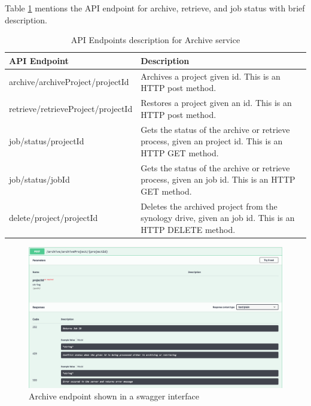     Table \ref{table:archiveEndpoints} mentions the API endpoint for archive, retrieve, and job status with brief description.
    \begin{table}[H]
        \centering
        \begin{tabular}{|p{6cm}|p{8cm}|}
            \hline
                \textbf{API Endpoint}&\textbf{Description}\\
            \hline
                archive/archiveProject/{{projectId}} & Archives a project given id. This is an HTTP post method.\\
            \hline
                retrieve/retrieveProject/{{projectId}} & Restores a project given an id. This is an HTTP post method.\\
            \hline
                job/status/{{projectId}} & Gets the status of the archive or retrieve process, given an project id. This is an HTTP GET method.\\
            \hline
                job/status/{{jobId}} & Gets the status of the archive or retrieve process, given an job id. This is an HTTP GET method.\\
            \hline
                delete/project/{{projectId}} & Deletes the archived project from the synology drive, given an job id. This is an HTTP DELETE method.\\
            \hline
        \end{tabular}
        \caption{API Endpoints description for Archive service}
        \label{table:archiveEndpoints}     
    \end{table}  
    \begin{figure}[H]
        \centering \includegraphics[scale=0.3]{grafiken/archiveSwagger.png}
        \caption{Archive endpoint shown in a swagger interface}
        \label{fig:archiveSwagger}
    \end{figure}

